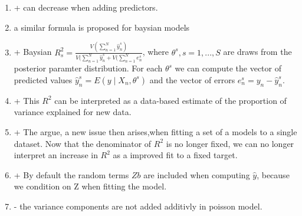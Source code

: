 \documentclass[11pt, a4paper]{article}\usepackage[]{graphicx}\usepackage[]{color}
\begin{document}
\begin {enumerate}
\item[+] can decrease when adding predictors.

\item  a similar formula is proposed for baysian models


\item[+] Baysian $R^2_{s} = \frac{V(\sum_{n=1}^{N}\hat{y}^s_{n})}{V(\sum_{n=1}^{N}\hat{y}^s_{n}+V(\sum_{n=1}^{N}e^s_{n}}$, where $\theta^s, s = 1, ... , S$ are draws from the posterior paramter distribution. For each $\theta^s$ we can compute the vector of predicted values $\hat{y}^s_{n}  = E \left({y \mid X_{n}, \theta^s}\right) $ and the vector of errors $e^s_{n} = y_{n} - \hat{y}^s_{n}$.

\item[+] This $R^2$ can be interpreted as  a data-based estimate of the proportion of variance explained for new data.

\item[+] The argue, a new issue then arises,when fitting a set of a models to a single dataset. Now that the denominator of $R^2$ is no longer fixed, we can no longer interpret an increase in $R^2$ as a improved fit to a fixed target.

\item[+] By default the random terms $Zb$ are included when computing $\hat{y}$, because we condition on Z when fitting the model.

\item[-] the variance components are not added additivly in poisson model. 


\end{enumerate}
\end{document}

